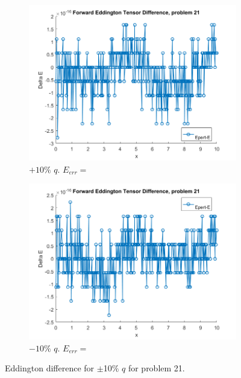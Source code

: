 \documentclass{article}
\begin{document}
\begin{figure}[H]
\centering
\begin{subfigure}{.5\textwidth}
  \centering
  \includegraphics[width=1\linewidth]{p21deltaEdq.png}
  \caption{$+10\%$ $q$. $E_{err}=$}
  \label{fig:sub1}
\end{subfigure}%
\begin{subfigure}{.5\textwidth}
  \centering
  \includegraphics[width=1\linewidth]{p21deltaEdq-10.png}
  \caption{$-10\%$ $q$. $E_{err}=$}
  \label{fig:sub2}
\end{subfigure}
\caption{Eddington difference for $\pm$10$\%$ $q$ for problem 21.}
\label{fig:test}
\end{figure}
\end{document}
